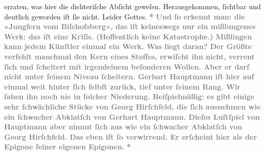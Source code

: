 \begin{ledgroupsized}[t]{13cm}
{{                  erraten, was hier die dichteriſche Abſicht geweſen. Herausgekommen, ſichtbar und
                  deutlich geworden iſt ſie nicht. Leider Gottes.}}\pend
           \pstart
           \centering{}\textcolor{gray}{\textbf{*}}\pend
           \pstart
           \noindent{}\textcolor{gray}{\textbf{Und ſo erkennt man: die »Jungfern vom Biſchofsberg«, das iſt keineswegs nur ein mißlungenes Werk:
                  das iſt eine Kriſis. (Hoffentlich keine Katastrophe.) Mißlingen kann jedem
                  Künſtler einmal ein Werk. Was liegt daran? Der Größte verfehlt manchmal den Kern
                  eines Stoffes, erwiſcht ihn nicht, verrent ſich und ſcheitert mit irgendeinem
                  beſonderen Wollen. Aber er darf nicht unter ſeinem Niveau ſcheitern. Gerhart Hauptmann iſt hier auf einmal weit
                  hinter ſich ſelbſt zurück, tief unter ſeinem Rang. Wir ſahen ihn noch nie in
                  ſolcher Niederung. Beiſpielmäßig: es gibt einige sehr ſchwächliche Stücke von Georg Hirſchfeld, die ſich ausnehmen wie ein
                  ſchwacher Abklatſch von Gerhart Hauptmann.
                  Dieſes Luſtſpiel von Hauptmann aber nimmt ſich aus wie ein
                  ſchwacher Abklatſch von Georg Hirſchfeld.
                  Das eben iſt ſo verwirrend. Er erſcheint hier als der Epigone ſeiner eigenen
                  Epigonen.}}\pend
           \pstart
           \centering{}\textcolor{gray}{\textbf{*}}\pend

\end{ledgroupsized}

